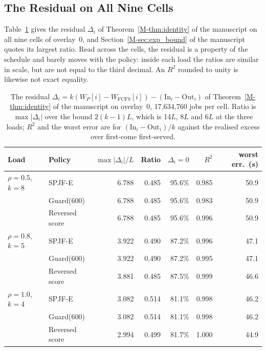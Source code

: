 \documentclass[mathematics,supfile,submit,moreauthors]{Definitions/mdpi}
\newcommand{\devnum}[1]{#1}
\begin{document}
\subsection{The Residual on All Nine Cells}

Table~\ref{tab:s_resid} gives the residual $\Delta_i$ of
Theorem~\ref*{M-thm:identity} of the manuscript on all nine cells of overlay~0, and
Section~\ref*{M-sec:exp_bound} of the manuscript quotes its largest ratio. Read across the
cells, the residual is a property of the schedule and barely moves with the policy: inside
each load the ratios are similar in scale, but are not equal to the third decimal.
An $R^2$ rounded to unity is likewise not exact equality.

\begin{table}[H]
\centering
\caption{The residual $\Delta_i = k(W_P[i] - W_{\mathrm{FCFS}}[i]) - (\mathrm{In}_i -
\mathrm{Out}_i)$ of Theorem~\ref*{M-thm:identity} of the manuscript on overlay~0,
\devnum{17{,}634{,}760} jobs per cell. Ratio is $\max|\Delta_i|$ over the bound $2(k-1)L$,
which is \devnum{14}$L$, \devnum{8}$L$ and \devnum{6}$L$ at the three loads;
$R^2$ and the worst error are for $(\mathrm{In}_i - \mathrm{Out}_i)/k$
against the realised excess over first-come first-served.}
\label{tab:s_resid}
\small
\setlength{\tabcolsep}{3pt}
\begin{tabular}{llrrrrr}
\toprule
Load & Policy & $\max|\Delta_i|/L$ & Ratio & $\Delta_i = 0$ & $R^2$ & worst err.\ (s) \\
\midrule
$\rho = \devnum{0.5}$, $k = \devnum{8}$
 & SPJF-E              & \devnum{6.788} & \devnum{0.485} & \devnum{95.6\%} & \devnum{0.985} & \devnum{50.9} \\
 & Guard($\devnum{600}$) & \devnum{6.788} & \devnum{0.485} & \devnum{95.6\%} & \devnum{0.983} & \devnum{50.9} \\
 & Reversed score      & \devnum{6.788} & \devnum{0.485} & \devnum{95.6\%} & \devnum{0.996} & \devnum{50.9} \\
\midrule
$\rho = \devnum{0.8}$, $k = \devnum{5}$
 & SPJF-E              & \devnum{3.922} & \devnum{0.490} & \devnum{87.2\%} & \devnum{0.996} & \devnum{47.1} \\
 & Guard($\devnum{600}$) & \devnum{3.922} & \devnum{0.490} & \devnum{87.2\%} & \devnum{0.995} & \devnum{47.1} \\
 & Reversed score      & \devnum{3.881} & \devnum{0.485} & \devnum{87.5\%} & \devnum{0.999} & \devnum{46.6} \\
\midrule
$\rho = \devnum{1.0}$, $k = \devnum{4}$
 & SPJF-E              & \devnum{3.082} & \devnum{0.514} & \devnum{81.1\%} & \devnum{0.998} & \devnum{46.2} \\
 & Guard($\devnum{600}$) & \devnum{3.082} & \devnum{0.514} & \devnum{81.1\%} & \devnum{0.998} & \devnum{46.2} \\
 & Reversed score      & \devnum{2.994} & \devnum{0.499} & \devnum{81.7\%} & \devnum{1.000} & \devnum{44.9} \\
\bottomrule
\end{tabular}
\end{table}
\end{document}
